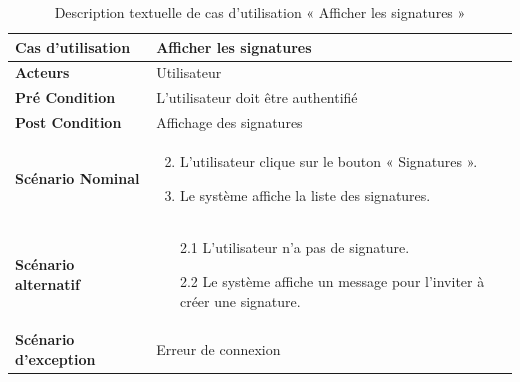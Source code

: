 
\begin{longtable}{|p{5cm}|p{10cm}|}
  \caption{Description textuelle de cas d'utilisation « Afficher les signatures »} \label{tab:use_case_view_signature}\\
\hline
\textbf{Cas d'utilisation}&Afficher les signatures\\
\hline
\textbf{Acteurs}&Utilisateur \\
\hline
\textbf{Pré Condition}&L'utilisateur doit être authentifié\\
\hline
\textbf{Post Condition}&Affichage des signatures\\
\hline
\textbf{Scénario Nominal}&
\vspace{-\baselineskip}
\begin{enumerate}
    \setcounter{enumi}{1}
    \item L'utilisateur clique sur le bouton « Signatures ».
    \item Le système affiche la liste des signatures.
\end{enumerate}\\
\hline
\textbf{Scénario alternatif}&
\begin{enumerate}
  \item [2.1] L'utilisateur n'a pas de signature.
  \item [2.2] Le système affiche un message pour l'inviter à créer une signature.
\end{enumerate}\\
\hline
\textbf{Scénario d'exception}&Erreur de connexion\\
\hline

\end{longtable}


